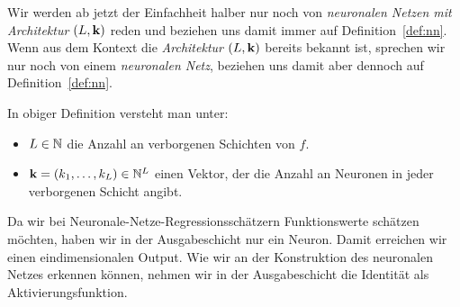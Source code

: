 Wir werden ab jetzt der Einfachheit halber nur noch von \emph{neuronalen Netzen mit Architektur $(L,\mathbf{k})$} reden und beziehen uns damit immer auf Definition~\ref{def:nn}. Wenn aus dem Kontext die \emph{Architektur $(L,\mathbf{k})$} bereits bekannt ist, sprechen wir nur noch von einem \emph{neuronalen Netz}, beziehen uns damit aber dennoch auf Definition~\ref{def:nn}.
\begin{bemnumber}
In obiger Definition versteht man unter:
\begin{itemize}
\item $L \in \mathbb{N}$ die Anzahl an verborgenen Schichten von $f$.
\item $\mathbf{k} = (k_1,\dots,k_L) \in \mathbb{N}^L$ einen Vektor, der die Anzahl an Neuronen in jeder verborgenen Schicht angibt.
\end{itemize}
\end{bemnumber}
Da wir bei Neuronale-Netze-Regressionsschätzern Funktionswerte schätzen möchten, haben wir in der Ausgabeschicht nur ein Neuron. Damit erreichen wir einen eindimensionalen Output. Wie wir an der Konstruktion des neuronalen Netzes erkennen können, nehmen wir in der Ausgabeschicht die Identität als Aktivierungsfunktion.

